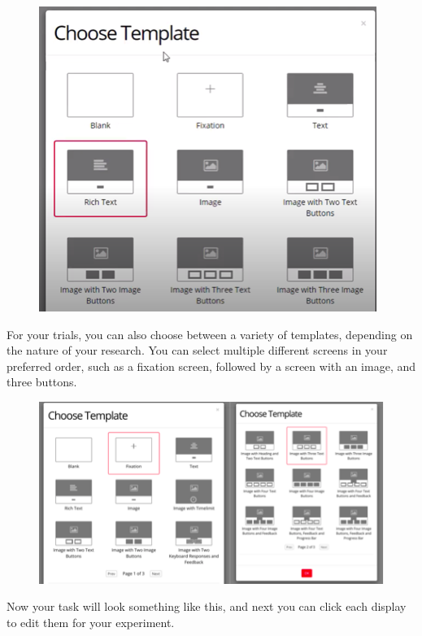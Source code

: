 \documentclass[]{book}
\begin{document}
\begin{figure}
\centering
\includegraphics{images/research_protocols/gorilla/gorilla16.png}
\caption{}
\end{figure}

For your trials, you can also choose between a variety of templates, depending on the nature of your research. You can select multiple different screens in your preferred order, such as a fixation screen, followed by a screen with an image, and three buttons.

\begin{figure}
\centering
\includegraphics{images/research_protocols/gorilla/gorilla17.png}
\caption{}
\end{figure}

Now your task will look something like this, and next you can click each display to edit them for your experiment.
\end{document}
